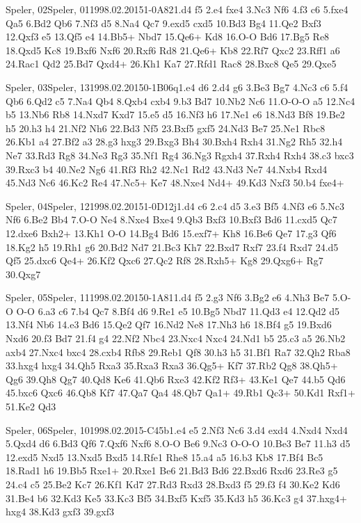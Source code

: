 \documentclass[twocolumn,a4paper,10pt]{report}
\begin{document}
\begin{chessgame}{Speler, 02}{Speler, 01}{1998.02.20}{15}{1-0}{A82}{1.d4 f5 2.e4 fxe4 3.Nc3 Nf6 4.f3 c6 5.fxe4 Qa5 6.Bd2 Qb6 7.Nf3 d5 8.Na4 Qc7 9.exd5 cxd5 10.Bd3 Bg4 11.Qe2 Bxf3 12.Qxf3 e5 13.Qf5 e4 14.Bb5+ Nbd7 15.Qe6+ Kd8 16.O-O Bd6 17.Bg5 Re8 18.Qxd5 Kc8 19.Bxf6 Nxf6 20.Rxf6 Rd8 21.Qe6+ Kb8 22.Rf7 Qxc2 23.Rff1 a6 24.Rac1 Qd2 25.Bd7 Qxd4+ 26.Kh1 Ka7 27.Rfd1 Rac8 28.Bxc8 Qe5 29.Qxe5}\end{chessgame}
\begin{chessgame}{Speler, 03}{Speler, 13}{1998.02.20}{15}{0-1}{B06q}{1.e4 d6 2.d4 g6 3.Be3 Bg7 4.Nc3 c6 5.f4 Qb6 6.Qd2 c5 7.Na4 Qb4 8.Qxb4 cxb4 9.b3 Bd7 10.Nb2 Nc6 11.O-O-O a5 12.Nc4 b5 13.Nb6 Rb8 14.Nxd7 Kxd7 15.e5 d5 16.Nf3 h6 17.Ne1 e6 18.Nd3 Bf8 19.Be2 h5 20.h3 h4 21.Nf2 Nh6 22.Bd3 Nf5 23.Bxf5 gxf5 24.Nd3 Be7 25.Ne1 Rbc8 26.Kb1 a4 27.Bf2 a3 28.g3 hxg3 29.Bxg3 Bh4 30.Bxh4 Rxh4 31.Ng2 Rh5 32.h4 Ne7 33.Rd3 Rg8 34.Ne3 Rg3 35.Nf1 Rg4 36.Ng3 Rgxh4 37.Rxh4 Rxh4 38.c3 bxc3 39.Rxc3 b4 40.Ne2 Ng6 41.Rf3 Rh2 42.Nc1 Rd2 43.Nd3 Ne7 44.Nxb4 Rxd4 45.Nd3 Nc6 46.Kc2 Re4 47.Nc5+ Ke7 48.Nxe4 Nd4+ 49.Kd3 Nxf3 50.b4 fxe4+}\end{chessgame}
\begin{chessgame}{Speler, 04}{Speler, 12}{1998.02.20}{15}{1-0}{D12j}{1.d4 c6 2.c4 d5 3.e3 Bf5 4.Nf3 e6 5.Nc3 Nf6 6.Be2 Bb4 7.O-O Ne4 8.Nxe4 Bxe4 9.Qb3 Bxf3 10.Bxf3 Bd6 11.cxd5 Qc7 12.dxe6 Bxh2+ 13.Kh1 O-O 14.Bg4 Bd6 15.exf7+ Kh8 16.Be6 Qe7 17.g3 Qf6 18.Kg2 h5 19.Rh1 g6 20.Bd2 Nd7 21.Bc3 Kh7 22.Bxd7 Rxf7 23.f4 Rxd7 24.d5 Qf5 25.dxc6 Qe4+ 26.Kf2 Qxc6 27.Qc2 Rf8 28.Rxh5+ Kg8 29.Qxg6+ Rg7 30.Qxg7\mate}\end{chessgame}
\begin{chessgame}{Speler, 05}{Speler, 11}{1998.02.20}{15}{0-1}{A81}{1.d4 f5 2.g3 Nf6 3.Bg2 e6 4.Nh3 Be7 5.O-O O-O 6.a3 c6 7.b4 Qc7 8.Bf4 d6 9.Re1 e5 10.Bg5 Nbd7 11.Qd3 e4 12.Qd2 d5 13.Nf4 Nb6 14.e3 Bd6 15.Qe2 Qf7 16.Nd2 Ne8 17.Nh3 h6 18.Bf4 g5 19.Bxd6 Nxd6 20.f3 Bd7 21.f4 g4 22.Nf2 Nbc4 23.Nxc4 Nxc4 24.Nd1 b5 25.c3 a5 26.Nb2 axb4 27.Nxc4 bxc4 28.cxb4 Rfb8 29.Reb1 Qf8 30.h3 h5 31.Bf1 Ra7 32.Qh2 Rba8 33.hxg4 hxg4 34.Qh5 Rxa3 35.Rxa3 Rxa3 36.Qg5+ Kf7 37.Rb2 Qg8 38.Qh5+ Qg6 39.Qh8 Qg7 40.Qd8 Ke6 41.Qb6 Rxe3 42.Kf2 Rf3+ 43.Ke1 Qe7 44.b5 Qd6 45.bxc6 Qxc6 46.Qb8 Kf7 47.Qa7 Qa4 48.Qb7 Qa1+ 49.Rb1 Qc3+ 50.Kd1 Rxf1+ 51.Ke2 Qd3\mate}\end{chessgame}
\begin{chessgame}{Speler, 06}{Speler, 10}{1998.02.20}{15}{\textonehalf-\textonehalf}{C45b}{1.e4 e5 2.Nf3 Nc6 3.d4 exd4 4.Nxd4 Nxd4 5.Qxd4 d6 6.Bd3 Qf6 7.Qxf6 Nxf6 8.O-O Be6 9.Nc3 O-O-O 10.Be3 Be7 11.h3 d5 12.exd5 Nxd5 13.Nxd5 Bxd5 14.Rfe1 Rhe8 15.a4 a5 16.b3 Kb8 17.Bf4 Bc5 18.Rad1 h6 19.Bb5 Rxe1+ 20.Rxe1 Be6 21.Bd3 Bd6 22.Bxd6 Rxd6 23.Re3 g5 24.c4 c5 25.Be2 Kc7 26.Kf1 Kd7 27.Rd3 Rxd3 28.Bxd3 f5 29.f3 f4 30.Ke2 Kd6 31.Be4 b6 32.Kd3 Ke5 33.Kc3 Bf5 34.Bxf5 Kxf5 35.Kd3 h5 36.Kc3 g4 37.hxg4+ hxg4 38.Kd3 gxf3 39.gxf3}\end{chessgame}
\end{document}
